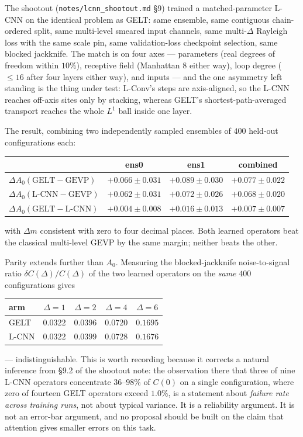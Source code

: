 \documentclass[11pt,a4paper]{article}
\begin{document}
The shootout (\texttt{notes/lcnn\_shootout.md} \S9) trained a matched-parameter
L-CNN on the identical problem as GELT: same ensemble, same contiguous
chain-ordered split, same multi-level smeared input channels, same multi-$\Delta$
Rayleigh loss with the same scale pin, same validation-loss checkpoint
selection, same blocked jackknife. The match is on four axes --- parameters
(real degrees of freedom within $10\%$), receptive field (Manhattan $8$ either
way), loop degree ($\le 16$ after four layers either way), and inputs --- and the
one asymmetry left standing is the thing under test: L-Conv's steps are
axis-aligned, so the L-CNN reaches off-axis sites only by stacking, whereas
GELT's shortest-path-averaged transport reaches the whole $L^1$ ball inside one
layer.

The result, combining two independently sampled ensembles of $400$ held-out
configurations each:
\begin{center}
\begin{tabular}{lccc}
\toprule
 & ens0 & ens1 & combined \\
\midrule
$\Delta A_0(\text{GELT} - \text{GEVP})$   & $+0.066 \pm 0.031$ & $+0.089 \pm 0.030$ & $+0.077 \pm 0.022$ \\
$\Delta A_0(\text{L-CNN} - \text{GEVP})$  & $+0.062 \pm 0.031$ & $+0.072 \pm 0.026$ & $+0.068 \pm 0.020$ \\
$\Delta A_0(\text{GELT} - \text{L-CNN})$  & $+0.004 \pm 0.008$ & $+0.016 \pm 0.013$ & $\mathbf{+0.007 \pm 0.007}$ \\
\bottomrule
\end{tabular}
\end{center}
with $\Delta m$ consistent with zero to four decimal places. Both learned
operators beat the classical multi-level GEVP by the same margin; neither beats
the other.

Parity extends further than $A_0$. Measuring the blocked-jackknife
noise-to-signal ratio $\delta C(\Delta)/C(\Delta)$ of the two learned operators
on the \emph{same} $400$ configurations gives
\begin{center}
\begin{tabular}{lcccc}
\toprule
arm & $\Delta = 1$ & $\Delta = 2$ & $\Delta = 4$ & $\Delta = 6$ \\
\midrule
GELT  & $0.0322$ & $0.0396$ & $0.0720$ & $0.1695$ \\
L-CNN & $0.0322$ & $0.0399$ & $0.0728$ & $0.1676$ \\
\bottomrule
\end{tabular}
\end{center}
--- indistinguishable. This is worth recording because it corrects a natural
inference from \S9.2 of the shootout note: the observation there that three of
nine L-CNN operators concentrate $36$--$98\%$ of $C(0)$ on a single
configuration, where zero of fourteen GELT operators exceed $1.0\%$, is a
statement about \emph{failure rate across training runs}, not about typical
variance. It is a reliability argument. It is not an error-bar argument, and no
proposal should be built on the claim that attention gives smaller errors on
this task.
\end{document}
